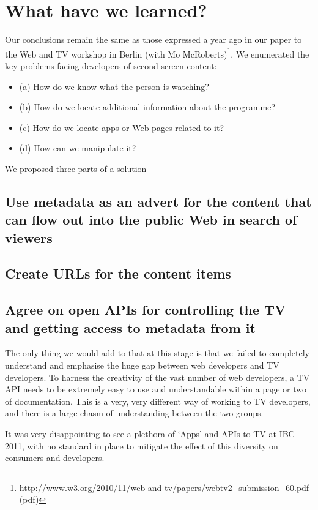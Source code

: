 \documentclass{notube}
\begin{document}
\section{What have we learned?}

Our conclusions remain the same as those expressed a year ago in our paper to the Web and TV workshop in Berlin (with Mo McRoberts)\footnote{\url{http://www.w3.org/2010/11/web-and-tv/papers/webtv2_submission_60.pdf} (pdf)}. We enumerated the key problems facing developers of second screen content:

\begin{itemize}
\item{(a) How do we know what the person is watching?}
\item{(b) How do we locate additional information about the programme?}
\item{(c) How do we locate apps or Web pages related to it?}
\item{(d) How can we manipulate it?}
\end{itemize}

We proposed three parts of a solution

\subsection{Use metadata as an advert for the content that can flow out into the public Web in search of viewers}
\subsection{Create URLs for the content items}
\subsection{Agree on open APIs for controlling the TV and getting access to metadata from it}

The only thing we would add to that at this stage is that we failed to completely understand and emphasise the huge gap between web developers and TV developers. To harness the creativity of the vast number of web developers, a TV API needs to be extremely easy to use and understandable within a page or two of documentation. This is a very, very different way of working to TV developers, and there is a large chasm of understanding between the two groups.

It was very disappointing to see a plethora of `Apps' and APIs to TV at IBC 2011, with no standard in place to mitigate the effect of this diversity on consumers and developers.
\end{document}
